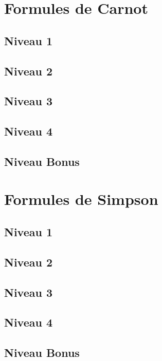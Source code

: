 \documentclass[a4paper]{report}
\begin{document}
		\section{Formules de Carnot}
		
			\subsection{Niveau 1}
		
			\subsection{Niveau 2}
		
			\subsection{Niveau 3}
			
			\subsection{Niveau 4}
			
			\subsection{Niveau Bonus}
		
		\section{Formules de Simpson}
		
			\subsection{Niveau 1}
		
			\subsection{Niveau 2}
		
			\subsection{Niveau 3}
			
			\subsection{Niveau 4}
			
			\subsection{Niveau Bonus}
		
\end{document}

